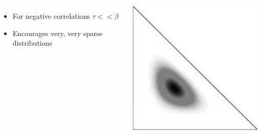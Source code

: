 {\begin{columns}
{			\begin{itemize}
				\item For negative correlations $\tau << \beta$
				\item Encourages very, very sparse distributions
			\end{itemize}
				\includegraphics[width=.7\linewidth]{interactive_topic_models/uniform_dirichlet}


			}




	\end{columns}

}

